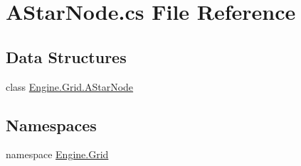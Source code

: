 \hypertarget{a00083}{}\section{A\+Star\+Node.\+cs File Reference}
\label{a00083}
\subsection*{Data Structures}
\begin{DoxyCompactItemize}
\item 
class \hyperlink{a00402}{Engine.\+Grid.\+A\+Star\+Node}
\end{DoxyCompactItemize}
\subsection*{Namespaces}
\begin{DoxyCompactItemize}
\item 
namespace \hyperlink{a00251}{Engine.\+Grid}
\end{DoxyCompactItemize}
